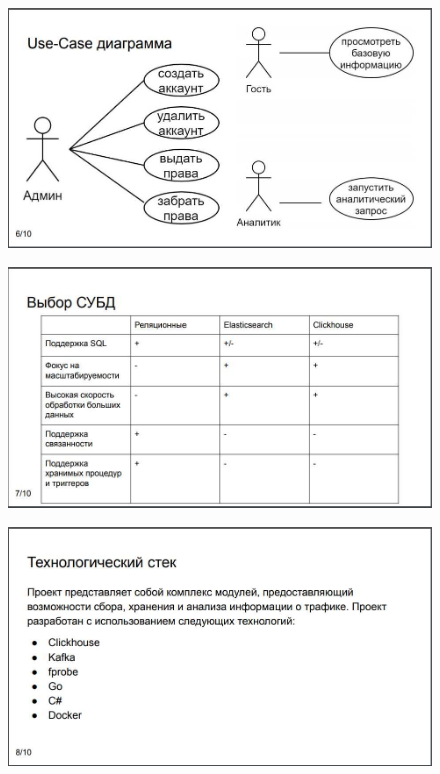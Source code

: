 \begin{figure}[H]
	\centering
	\includegraphics[scale=0.35]{pr6.jpg}
\end{figure}
\begin{figure}[H]
	\centering
	\includegraphics[scale=0.35]{pr7.jpg}
\end{figure}
\begin{figure}[H]
	\centering
	\includegraphics[scale=0.35]{pr8.jpg}
\end{figure}
